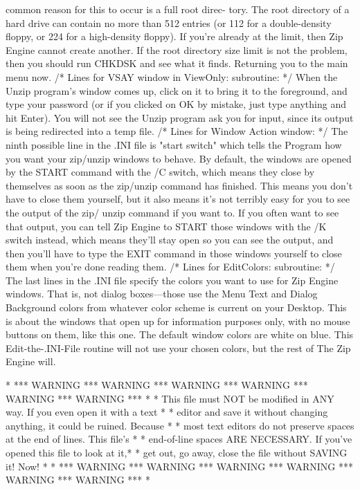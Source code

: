 common reason for this to occur is a full root direc-
tory.  The root directory of a hard drive can contain
no more than 512 entries (or 112 for a double-density
floppy, or 224 for a high-density floppy).  If you're
already at the limit, then Zip Engine cannot create
another.  If the root directory size limit is not the
problem, then you should run CHKDSK and see what it
finds.  Returning you to the main menu now.
/* Lines for VSAY window in ViewOnly: subroutine: */
When the Unzip program's window comes up, click on it to bring it to the
foreground, and type your password (or if you clicked on OK by mistake,
just type anything and hit Enter).  You will not see the Unzip program
ask you for input, since its output is being redirected into a temp file.
/* Lines for Window Action window: */
The ninth possible line in the .INI file is "start switch" which tells
the Program how you want your zip/unzip windows to behave.  By default,
the windows are opened by the START command with the /C switch, which
means they close by themselves as soon as the zip/unzip command has
finished.  This means you don't have to close them yourself, but it
also means it's not terribly easy for you to see the output of the zip/
unzip command if you want to.  If you often want to see that output,
you can tell Zip Engine to START those windows with the /K switch
instead, which means they'll stay open so you can see the output, and
then you'll have to type the EXIT command in those windows yourself to
close them when you're done reading them.
/* Lines for EditColors: subroutine: */
The last lines in the .INI file specify the colors you
want to use for Zip Engine windows.  That is, not dialog
boxes---those use the Menu Text and Dialog Background
colors from whatever color scheme is current on your
Desktop.  This is about the windows that open up for
information purposes only, with no mouse buttons on them,
like this one.  The default window colors are white on
blue.  This Edit-the-.INI-File routine will not use
your chosen colors, but the rest of The Zip Engine will.

* *** WARNING *** WARNING *** WARNING *** WARNING *** WARNING *** WARNING *** *
* This file must NOT be modified in ANY way.  If you even open it with a text *
* editor and save it without changing anything, it could be ruined.  Because  *
* most text editors do not preserve spaces at the end of lines.  This file's  *
* end-of-line spaces ARE NECESSARY.  If you've opened this file to look at it,*
* get out, go away, close the file without SAVING it!  Now!                   *
* *** WARNING *** WARNING *** WARNING *** WARNING *** WARNING *** WARNING *** *
